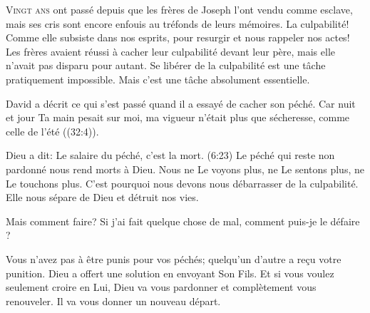 \dvrule







\lettrine{V}{ingt ans} ont passé depuis que les frères de Joseph
 l'ont vendu comme esclave, mais ses cris sont encore enfouis
 au tréfonds de leurs mémoires. La culpabilité!
 Comme elle subsiste dans nos esprits, pour resurgir
 et nous rappeler nos actes!
 Les frères avaient réussi à cacher leur culpabilité devant leur père,
 mais elle n'avait pas disparu pour autant.
 Se libérer de la culpabilité est une tâche pratiquement impossible.
 Mais c'est une tâche absolument essentielle. 


David a décrit ce qui s'est passé quand il a essayé de cacher son péché.
 \Og Car nuit et jour Ta main pesait sur moi,
 ma vigueur n'était plus que sécheresse, comme celle de l'été \Fg{}
 ((32:4)). 

Dieu a dit: \Og Le salaire du péché, c'est la mort. \Fg{}
 (6:23)
 Le péché qui reste non pardonné nous rend morts à Dieu.
 Nous ne Le voyons plus, ne Le sentons plus, ne Le touchons plus.
 C'est pourquoi nous devons nous débarrasser de la culpabilité.
 Elle nous sépare de Dieu et détruit nos vies. 

Mais comment faire? Si j'ai fait quelque chose de mal,
 comment puis-je le \Og défaire \Fg{} ? 

Vous n'avez pas à être punis pour vos péchés;
 quelqu'un d'autre a re\c{c}u votre punition.
 Dieu a offert une solution en envoyant Son Fils.
 Et si vous voulez seulement croire en Lui,
 Dieu va vous pardonner et complètement vous renouveler.
 Il va vous donner un nouveau départ.

\dvrule

